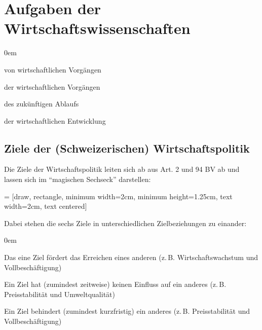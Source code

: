 \section{Aufgaben der Wirtschaftswissenschaften}
\begin{description}\itemsep0em
	\item [Beschreiben] von wirtschaftlichen Vorgängen
	\item [Erklären] der wirtschaftlichen Vorgängen
	\item [Prognostizieren] des zukünftigen Ablaufs
	\item [Beeinflussen] der wirtschaftlichen Entwicklung
\end{description}

\subsection{Ziele der (Schweizerischen) Wirtschaftspolitik}
Die Ziele der Wirtschaftspolitik leiten sich ab aus Art. 2 und 94 BV ab und lassen sich im \enquote{magischen Sechseck}
darstellen:
\begin{center}
 = [draw, rectangle, minimum width=2cm, minimum height=1.25cm, text width=2cm, text centered]
\end{center}
Dabei stehen die sechs Ziele in unterschiedlichen Zielbeziehungen zu einander:
\begin{description}\itemsep0em
	\item [Zielharmonie] Das eine Ziel fördert das Erreichen eines anderen 
	(z.\,B. Wirtschaftswachstum und Vollbeschäftigung)
	\item [Zielneutralität] Ein Ziel hat (zumindest zeitweise) keinen Einfluss auf ein anderes
	(z.\,B. Preisstabilität und Umweltqualität)
	\item [Zielkonkurrenz] Ein Ziel behindert (zumindest kurzfristig) ein anderes
	(z.\,B. Preisstabilität und Vollbeschäftigung)
\end{description}

